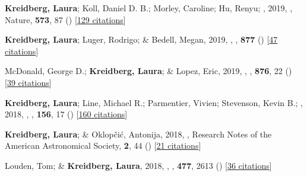 \item[{\color{numcolor}\scriptsize16}] \textbf{Kreidberg, Laura}; Koll, Daniel D. B.; Morley, Caroline; Hu, Renyu; \etal, 2019, , Nature, \textbf{573}, 87 () [\href{https://ui.adsabs.harvard.edu/abs/2019Natur.573...87K}{129 citations}]

\item[{\color{numcolor}\scriptsize15}] \textbf{Kreidberg, Laura}; Luger, Rodrigo; \& Bedell, Megan, 2019, , \apj, \textbf{877} () [\href{https://ui.adsabs.harvard.edu/abs/2019ApJ...877L..15K}{47 citations}]

\item[{\color{numcolor}\scriptsize14}] McDonald, George D.; \textbf{Kreidberg, Laura}; \& Lopez, Eric, 2019, , \apj, \textbf{876}, 22 () [\href{https://ui.adsabs.harvard.edu/abs/2019ApJ...876...22M}{39 citations}]

\item[{\color{numcolor}\scriptsize13}] \textbf{Kreidberg, Laura}; Line, Michael R.; Parmentier, Vivien; Stevenson, Kevin B.; \etal, 2018, , \aj, \textbf{156}, 17 () [\href{https://ui.adsabs.harvard.edu/abs/2018AJ....156...17K}{160 citations}]

\item[{\color{numcolor}\scriptsize12}] \textbf{Kreidberg, Laura}; \& Oklop{\v{c}}i{\'c}, Antonija, 2018, , Research Notes of the American Astronomical Society, \textbf{2}, 44 () [\href{https://ui.adsabs.harvard.edu/abs/2018RNAAS...2...44K}{21 citations}]

\item[{\color{numcolor}\scriptsize11}] Louden, Tom; \& \textbf{Kreidberg, Laura}, 2018, , \mnras, \textbf{477}, 2613 () [\href{https://ui.adsabs.harvard.edu/abs/2018MNRAS.477.2613L}{36 citations}]

